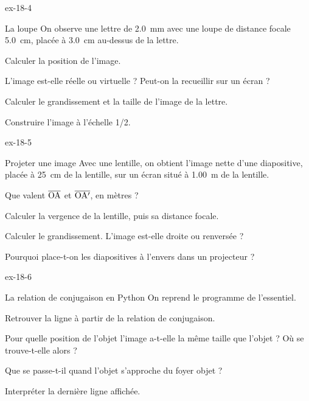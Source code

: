 \begin{blocLivre}{ex-18-4}
\begin{exercice}[1]{La loupe}
On observe une lettre de \qty{2,0}{mm} avec une loupe de distance focale \qty{5,0}{cm}, placée à \qty{3,0}{cm} au-dessus de la lettre.
\begin{questions}
\item Calculer la position de l'image.
\item L'image est-elle réelle ou virtuelle ? Peut-on la recueillir sur un écran ?
\item Calculer le grandissement et la taille de l'image de la lettre.
\item Construire l'image à l'échelle 1/2.
\end{questions}
\end{exercice}
\end{blocLivre}
\begin{blocLivre}{ex-18-5}
\begin{exercice}[1]{Projeter une image}
Avec une lentille, on obtient l'image nette d'une diapositive, placée à \qty{25}{cm} de la lentille, sur un écran situé à \qty{1,00}{m} de la lentille.
\begin{questions}
\item Que valent $\overline{\mathrm{OA}}$ et $\overline{\mathrm{OA'}}$, en mètres ?
\item Calculer la vergence de la lentille, puis sa distance focale.
\item Calculer le grandissement. L'image est-elle droite ou renversée ?
\item Pourquoi place-t-on les diapositives à l'envers dans un projecteur ?
\end{questions}
\end{exercice}
\end{blocLivre}
\begin{blocLivre}{ex-18-6}
\begin{exercice}[2]{La relation de conjugaison en Python}
On reprend le programme de l'essentiel.
\begin{questions}
\item {}Retrouver la ligne  à partir de la relation de conjugaison.
\item Pour quelle position de l'objet l'image a-t-elle la même taille que l'objet ? Où se trouve-t-elle alors ?
\item Que se passe-t-il quand l'objet s'approche du foyer objet ?
\item Interpréter la dernière ligne affichée.
\end{questions}
\end{exercice}
\end{blocLivre}
